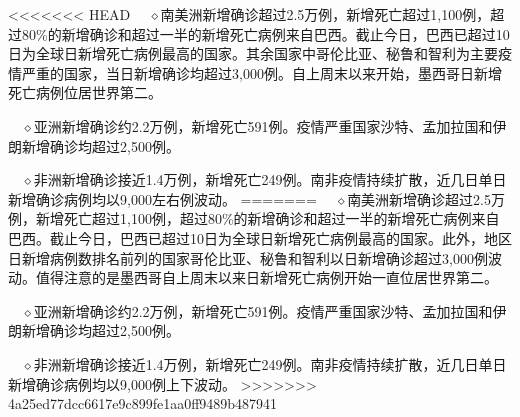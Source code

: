\documentclass[
]{article}
\begin{document}
<<<<<<< HEAD
\(\quad\)\(\diamond\)南美洲新增确诊超过2.5万例，新增死亡超过1,100例，超过80\%的新增确诊和超过一半的新增死亡病例来自巴西。截止今日，巴西已超过10日为全球日新增死亡病例最高的国家。其余国家中哥伦比亚、秘鲁和智利为主要疫情严重的国家，当日新增确诊均超过3,000例。自上周末以来开始，墨西哥日新增死亡病例位居世界第二。

\(\quad\)\(\diamond\)亚洲新增确诊约2.2万例，新增死亡591例。疫情严重国家沙特、孟加拉国和伊朗新增确诊均超过2,500例。

\(\quad\)\(\diamond\)非洲新增确诊接近1.4万例，新增死亡249例。南非疫情持续扩散，近几日单日新增确诊病例均以9,000左右例波动。
=======
\(\quad\)\(\diamond\)南美洲新增确诊超过2.5万例，新增死亡超过1,100例，超过80\%的新增确诊和超过一半的新增死亡病例来自巴西。截止今日，巴西已超过10日为全球日新增死亡病例最高的国家。此外，地区日新增病例数排名前列的国家哥伦比亚、秘鲁和智利以日新增确诊超过3,000例波动。值得注意的是墨西哥自上周末以来日新增死亡病例开始一直位居世界第二。

\(\quad\)\(\diamond\)亚洲新增确诊约2.2万例，新增死亡591例。疫情严重国家沙特、孟加拉国和伊朗新增确诊均超过2,500例。

\(\quad\)\(\diamond\)非洲新增确诊接近1.4万例，新增死亡249例。南非疫情持续扩散，近几日单日新增确诊病例均以9,000例上下波动。
>>>>>>> 4a25ed77dcc6617e9c899fe1aa0ff9489b487941
\end{document}
